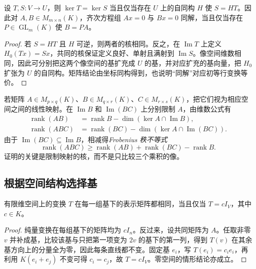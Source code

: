 \begin{theorem}
\label{thm:xie-ex-same-kernel}
设 $T,S:V\to U$，则 $\ker T=\ker S$ 当且仅当存在 $U$ 上的自同构 $H$ 使 $S=HT$。因此对 $A,B\in M_{m\times n}(K)$，齐次方程组 $Ax=0$ 与 $Bx=0$ 同解，当且仅当存在 $P\in\operatorname{GL}_m(K)$ 使 $B=PA$。
\end{theorem}

\begin{proof}
若 $S=HT$ 且 $H$ 可逆，则两者的核相同。反之，在 $\operatorname{Im}T$ 上定义 $H_0(Tx)=Sx$，共同的核保证定义良好、单射且满射到 $\operatorname{Im}S$。像空间维数相同，因此可分别把这两个像空间的基扩充成 $U$ 的基，并对应扩充的基向量，把 $H_0$ 扩张为 $U$ 的自同构。矩阵结论由坐标同构得到，也说明“同解”对应初等行变换等价。
\end{proof}

若矩阵 $A\in M_{p\times q}(K)$、$B\in M_{q\times r}(K)$、$C\in M_{r\times s}(K)$，把它们视为相应空间之间的线性映射。在 $\operatorname{Im}B$ 和 $\operatorname{Im}(BC)$ 上分别限制 $A$，由维数公式有
\[
\begin{aligned}
    \operatorname{rank}(AB)
    &=\operatorname{rank}B-\dim(\ker A\cap\operatorname{Im}B),\\
    \operatorname{rank}(ABC)
    &=\operatorname{rank}(BC)-\dim(\ker A\cap\operatorname{Im}(BC)).
\end{aligned}
\]
由于 $\operatorname{Im}(BC)\subseteq\operatorname{Im}B$，相减得\emph{Frobenius 秩不等式}
\begin{equation}
\label{eq:xie-ex-frobenius-rank}
    \operatorname{rank}(ABC)\geq
    \operatorname{rank}(AB)+\operatorname{rank}(BC)-\operatorname{rank}B.
\end{equation}
证明的关键是限制映射的核，而不是只比较三个乘积的像。

\subsection{根据空间结构选择基}

\begin{proposition}
\label{prop:xie-ex-basis-independent-matrix}
有限维空间上的变换 $T$ 在每一组基下的表示矩阵都相同，当且仅当 $T=cI_V$，其中 $c\in K$。
\end{proposition}

\begin{proof}
纯量变换在每组基下的矩阵均为 $cI_n$。反过来，设共同矩阵为 $A$。任取非零 $v$ 并补成基，比较该基与只把第一项变为 $2v$ 的基下的第一列，得到 $T(v)$ 在其余基方向上的分量全为零，因此每条直线都不变。固定基 $e_i$，写 $T(e_i)=c_ie_i$，再利用 $K(e_i+e_j)$ 不变可得 $c_i=c_j$，故 $T=cI_V$。零空间的情形结论亦成立。
\end{proof}

